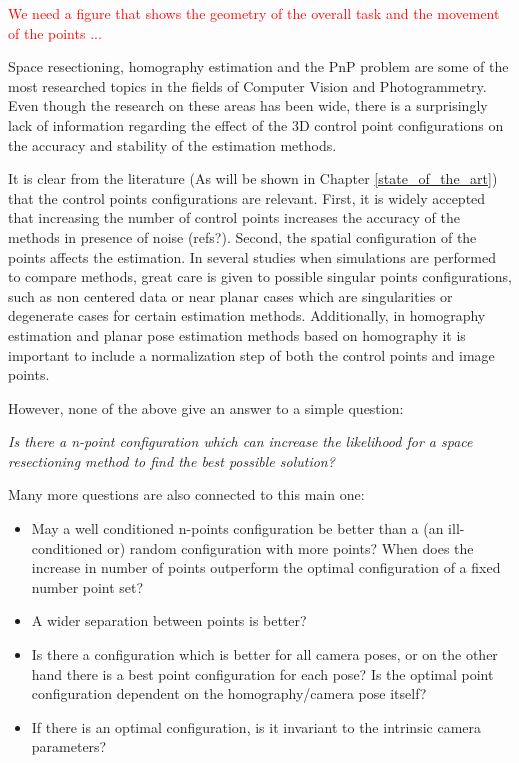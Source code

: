 \documentclass[letterpaper, 10 pt, conference]{ieeeconf}  %
\begin{document}
\textcolor{red}{We need a figure that shows the geometry of the overall task and the movement of the points ...}

Space resectioning, homography estimation and the PnP problem are some of the most researched topics in the fields of Computer Vision and Photogrammetry. Even though the research on these areas has been wide, there is a surprisingly lack of information regarding the effect of the 3D control point configurations on the accuracy and stability of the estimation methods.

It is clear from the literature (As will be shown in Chapter \ref{state_of_the_art}) that the control points configurations are relevant. First, it is widely accepted that increasing the number of control points increases the accuracy of the methods in presence of noise (refs?). Second, the spatial configuration of the points affects the estimation. In several studies when simulations are performed to compare methods, great care is given to possible singular points configurations, such as non centered data or near planar cases which are singularities or degenerate cases for certain estimation methods. Additionally, in homography estimation and planar pose estimation methods based on homography it is important to include a normalization step of both the control points and image points. 

However, none of the above give an answer to a simple question: 

\textit{Is there a n-point configuration which can increase the likelihood for a space resectioning method to find the best possible solution?}

Many more questions are also connected to this main one:

\begin{itemize}
\item May a well conditioned n-points configuration be better than a (an ill-conditioned or) random configuration with more points? When does the increase in number of points outperform the optimal configuration of a fixed number point set? 
\item A wider separation between points is better?
\item Is there a configuration which is better for all camera poses, or on the other hand there is a best point configuration for each pose? Is the optimal point configuration dependent on the homography/camera pose itself?
\item If there is an optimal configuration, is it invariant to the intrinsic camera parameters?
\end{itemize}
\end{document}
